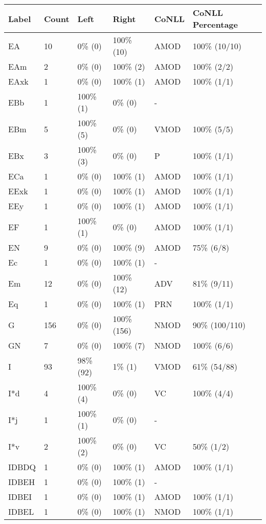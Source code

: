 \begin{figure*}
\begin{tabular}{|l|l|l|l||l|l|}
\hline
Label & Count & Left & Right & CoNLL & CoNLL Percentage\\ 
\hline
 EA & 10 & 0\% (0) & 100\% (10) & AMOD & 100\% (10/10) \\ 
\hline
 EAm & 2 & 0\% (0) & 100\% (2) & AMOD & 100\% (2/2) \\ 
\hline
 EAxk & 1 & 0\% (0) & 100\% (1) & AMOD & 100\% (1/1) \\ 
\hline
 EBb & 1 & 100\% (1) & 0\% (0) & - &  \\ 
\hline
 EBm & 5 & 100\% (5) & 0\% (0) & VMOD & 100\% (5/5) \\ 
\hline
 EBx & 3 & 100\% (3) & 0\% (0) & P & 100\% (1/1) \\ 
\hline
 ECa & 1 & 0\% (0) & 100\% (1) & AMOD & 100\% (1/1) \\ 
\hline
 EExk & 1 & 0\% (0) & 100\% (1) & AMOD & 100\% (1/1) \\ 
\hline
 EEy & 1 & 0\% (0) & 100\% (1) & AMOD & 100\% (1/1) \\ 
\hline
 EF & 1 & 100\% (1) & 0\% (0) & AMOD & 100\% (1/1) \\ 
\hline
 EN & 9 & 0\% (0) & 100\% (9) & AMOD & 75\% (6/8) \\ 
\hline
 Ec & 1 & 0\% (0) & 100\% (1) & - &  \\ 
\hline
 Em & 12 & 0\% (0) & 100\% (12) & ADV & 81\% (9/11) \\ 
\hline
 Eq & 1 & 0\% (0) & 100\% (1) & PRN & 100\% (1/1) \\ 
\hline
 G & 156 & 0\% (0) & 100\% (156) & NMOD & 90\% (100/110) \\ 
\hline
 GN & 7 & 0\% (0) & 100\% (7) & NMOD & 100\% (6/6) \\ 
\hline
 I & 93 & 98\% (92) & 1\% (1) & VMOD & 61\% (54/88) \\ 
\hline
 I*d & 4 & 100\% (4) & 0\% (0) & VC & 100\% (4/4) \\ 
\hline
 I*j & 1 & 100\% (1) & 0\% (0) & - &  \\ 
\hline
 I*v & 2 & 100\% (2) & 0\% (0) & VC & 50\% (1/2) \\ 
\hline
 IDBDQ & 1 & 0\% (0) & 100\% (1) & AMOD & 100\% (1/1) \\ 
\hline
 IDBEH & 1 & 0\% (0) & 100\% (1) & - &  \\ 
\hline
 IDBEI & 1 & 0\% (0) & 100\% (1) & AMOD & 100\% (1/1) \\ 
\hline
 IDBEL & 1 & 0\% (0) & 100\% (1) & NMOD & 100\% (1/1) \\ 

\end{tabular}
\end{figure*}
